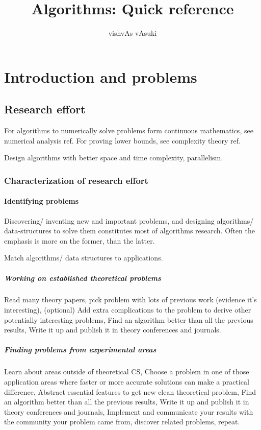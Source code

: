 \documentclass[oneside, article]{memoir}
\title{Algorithms: Quick reference}
\author{vishvAs vAsuki}
\begin{document}
\maketitle
\tableofcontents

\part{Introduction and problems}
\chapter{Research effort}
For algorithms to numerically solve problems form continuous mathematics, see numerical analysis ref. For proving lower bounds, see complexity theory ref.

Design algorithms with better space and time complexity, parallelism.

\section{Characterization of research effort}
\subsection{Identifying problems}
Discovering/ inventing new and important problems, and designing algorithms/ data-structures to solve them constitutes most of algorithms research. Often the emphasis is more on the former, than the latter.

Match algorithms/ data structures to applications.

\subsubsection{Working on established theoretical problems}
Read many theory papers, pick problem with lots of previous work (evidence it's interesting), (optional) Add extra complications to the problem to derive other potentially interesting problems, Find an algorithm better than all the previous results, Write it up and publish it in theory conferences and journals.

\subsubsection{Finding problems from experimental areas}
Learn about areas outside of theoretical CS, Choose a problem in one of those application areas where faster or more accurate solutions can make a practical difference, Abstract essential features to get new clean theoretical problem, Find an algorithm better than all the previous results, Write it up and publish it in theory conferences and journals, Implement and communicate your results with the community your problem came from, discover related problems, repeat.
\end{document}
